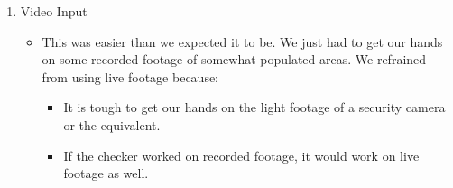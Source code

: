 \documentclass[a4paper]{article}
\begin{document}
\begin{enumerate}
    \item Video Input
          \begin{itemize}[label={}]
              \item This was easier than we expected it to be. We just had to get our hands
                    on some recorded footage of somewhat populated areas. We refrained from using live
                    footage because:
                    \begin{itemize}
                        \item It is tough to get our hands on the light footage of a security camera or the equivalent.
                        \item If the checker worked on recorded footage, it would work on live footage as well.
                    \end{itemize}


\end{itemize}
\end{enumerate}
\end{document}
